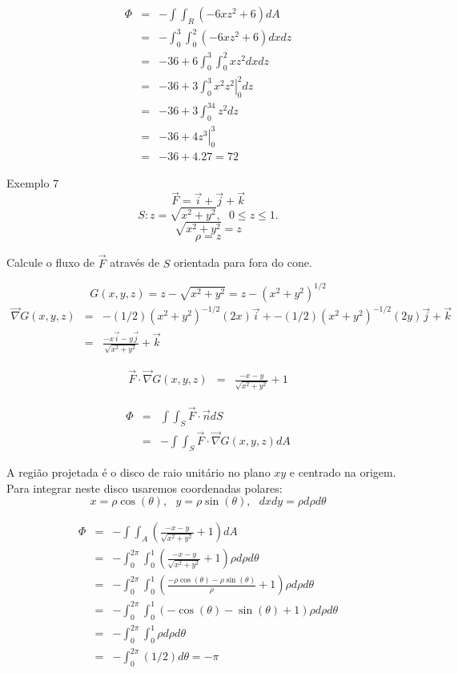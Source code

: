 \documentclass[a4paper,10pt]{book}
\begin{document}
\begin{eqnarray*}
\Phi&=&-\int\int_R (-6xz^2+6)dA\\
&=&-\int_0^3\int_0^2 (-6xz^2+6)dxdz\\
&=&-36+6\int_0^3\int_0^2xz^2dxdz\\
&=&-36+3\int_0^3\left.x^2z^2\right|_0^2 dz\\
&=&-36+3\int_0^34z^2dz\\
&=&-36+4\left. z^3\right|_0^3\\
&=&-36+4.27=72
\end{eqnarray*}

Exemplo 7 $$\vec{F}=\vec{i}+\vec{j}+\vec{k}$$
$$S:z=\sqrt{x^2+y^2},~~~  0\leq z\leq 1.$$
$$\sqrt{x^2+y^2}=z$$
$$\rho=z$$

Calcule o fluxo de $\vec{F}$ através de $S$ orientada para fora do cone.

$$G(x,y,z)=z-\sqrt{x^2+y^2}=z-(x^2+y^2)^{1/2}$$
\begin{eqnarray*}
\vec{\nabla}G(x,y,z)&=&-(1/2)(x^2+y^2)^{-1/2}(2x)\vec{i}+-(1/2)(x^2+y^2)^{-1/2}(2y)\vec{j}+\vec{k} \\
&=&\frac{-x\vec{i}-y\vec{j}}{\sqrt{x^2+y^2}}+\vec{k}
\end{eqnarray*}


\begin{eqnarray*}
\vec{F}\cdot \vec{\nabla}G(x,y,z)&=&\frac{-x-y}{\sqrt{x^2+y^2}}+1
\end{eqnarray*}


\begin{eqnarray*}
\Phi&=&\int\int_S\vec{F}\cdot \vec{n}dS\\&=&- \int\int_S\vec{F}\cdot \vec{\nabla}G(x,y,z)dA 
\end{eqnarray*}

A região projetada é o disco de raio unitário no plano $xy$ e centrado na origem. Para integrar neste disco usaremos coordenadas polares:
$$x=\rho\cos(\theta),~~~y=\rho\sin(\theta),~~~dxdy =\rho d\rho d\theta $$

\begin{eqnarray*}
\Phi&=&- \int\int_A\left(\frac{-x-y}{\sqrt{x^2+y^2}}+1\right)dA \\
&=&- \int_0^{2\pi}\int_0^1\left(\frac{-x-y}{\sqrt{x^2+y^2}}+1\right)\rho d\rho d\theta \\
&=&- \int_0^{2\pi}\int_0^1\left(\frac{-\rho\cos(\theta)-\rho\sin(\theta)}{\rho}+1\right)\rho d\rho d\theta \\
&=&- \int_0^{2\pi}\int_0^1\left({-\cos(\theta)-\sin(\theta)}+1\right)\rho d\rho d\theta \\
&=&- \int_0^{2\pi}\int_0^1\rho d\rho d\theta \\
&=&- \int_0^{2\pi}(1/2) d\theta=-\pi 
\end{eqnarray*}
\end{document}
